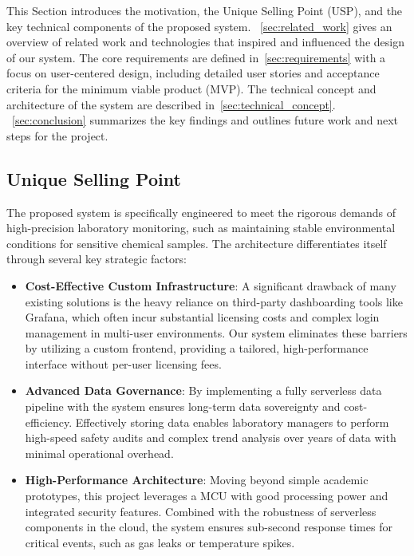 \documentclass[conference,a4paper,flushend]{cs-techrep} %
\begin{document}
This Section introduces the motivation, the Unique Selling Point (USP), and the key technical components of the proposed system. 
~\cref{sec:related_work} gives an overview of related work and technologies that inspired and influenced the design of our system.
The core requirements are defined in~\cref{sec:requirements} with a focus on user-centered design, including detailed user stories and
 acceptance criteria for the minimum viable product (MVP).
The technical concept and architecture of the system are described in~\cref{sec:technical_concept}.
~\cref{sec:conclusion} summarizes the key findings and outlines future work and next steps for the project.

\subsection{Unique Selling Point}\label{sec:unique_selling_point}

The proposed system is specifically engineered to meet the rigorous demands of high-precision laboratory monitoring, 
such as maintaining stable environmental conditions for sensitive chemical samples. The architecture differentiates 
itself through several key strategic factors:

\begin{itemize}
    \item \textbf{Cost-Effective Custom Infrastructure}: A significant drawback of many existing solutions is the heavy 
    reliance on third-party dashboarding tools like Grafana, which often incur substantial licensing costs and 
    complex login management in multi-user environments. Our system eliminates these barriers by utilizing a 
    custom frontend, providing a tailored, high-performance interface without per-user licensing fees.
    \item \textbf{Advanced Data Governance}: By implementing a fully serverless data pipeline with 
    the system ensures long-term data sovereignty and cost-efficiency. 
    Effectively storing data enables laboratory managers to perform high-speed safety audits and complex trend 
    analysis over years of data with minimal operational overhead.
    \item \textbf{High-Performance Architecture}: Moving beyond simple academic prototypes, this project leverages 
    a MCU with good processing power and integrated security features. Combined with the robustness 
    of serverless components in the cloud, the system ensures sub-second response times for critical events, 
    such as gas leaks or temperature spikes.
\end{itemize}
\end{document}
